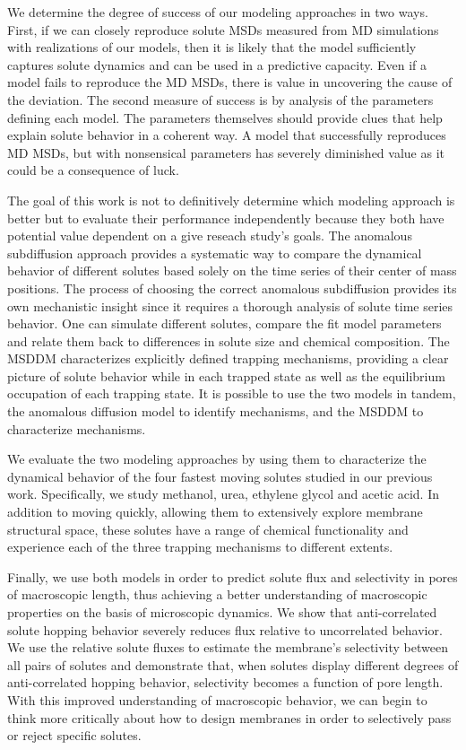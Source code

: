 \documentclass{article}
\begin{document}
  We determine the degree of success of our modeling approaches in two ways. First,
  if we can closely reproduce solute MSDs measured from MD simulations with realizations
  of our models, then it is likely that the model sufficiently captures solute 
  dynamics and can be used in a predictive capacity. Even if a model fails to 
  reproduce the MD MSDs, there is value in uncovering the cause of the deviation.
  The second measure of success is by analysis of the parameters defining each 
  model. The parameters themselves should provide clues that help explain solute 
  behavior in a coherent way. A model that successfully reproduces MD MSDs, but 
  with nonsensical parameters has severely diminished value as it could be a 
  consequence of luck.
  
  The goal of this work is not to definitively determine which modeling approach
  is better but to evaluate their performance independently because they both
  have potential value dependent on 
  a give reseach study's
  goals. The anomalous subdiffusion
  approach provides a systematic way to compare the dynamical behavior of different
  solutes based solely on the time series of their center of mass positions. The process
  of choosing the correct anomalous subdiffusion provides its own mechanistic insight
  since it requires a thorough analysis of solute time series behavior. One can simulate
  different solutes, compare the fit model parameters and relate them back to 
  differences in solute size and chemical composition. The MSDDM characterizes 
  explicitly defined trapping mechanisms, providing a clear picture of solute behavior
  while in each trapped state as well as the equilibrium occupation of each trapping state.
  It is possible to use the two models in tandem, the anomalous diffusion model to
  identify mechanisms, and the MSDDM to characterize mechanisms. 
  
  We evaluate the two modeling approaches by using them to characterize the dynamical
  behavior of the four fastest moving solutes studied in our previous work.
  Specifically, we study methanol, urea, ethylene glycol and acetic acid. In addition
  to moving quickly, allowing them to extensively explore membrane structural space,
  these solutes have a range of chemical functionality and experience each of the 
  three trapping mechanisms to different extents.
  
  Finally, we use both models in order to predict solute flux and selectivity in 
  pores of macroscopic length, thus achieving a better understanding
  of macroscopic properties on the basis of microscopic dynamics. We show that 
  anti-correlated solute hopping behavior severely reduces flux relative to 
  uncorrelated behavior. We use the relative solute fluxes to 
  estimate
  the 
  membrane's selectivity between all pairs of solutes and demonstrate that, when 
  solutes display different degrees of anti-correlated hopping behavior, selectivity
  becomes a function of pore length. With this improved understanding of 
  macroscopic behavior, we can begin to think more critically about how to design 
  membranes in order to selectively pass or reject specific solutes.
  
\end{document}
